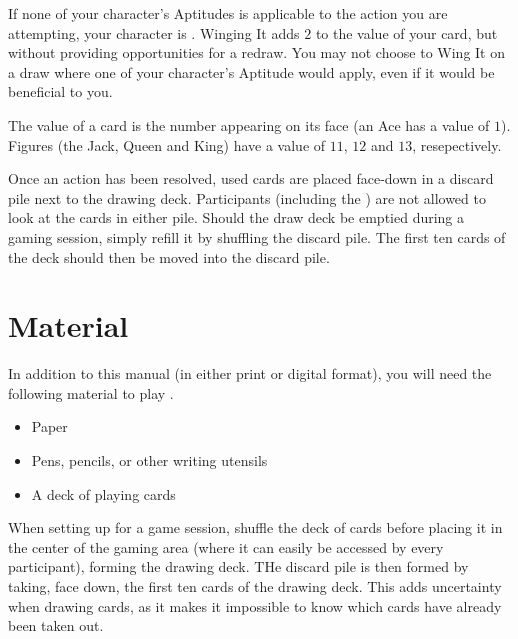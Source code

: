 If none of your character's Aptitudes is applicable to the action you are attempting, your character
is . Winging It adds $2$ to the value of your card, but without providing opportunities
for a redraw. You may not choose to Wing It on a draw where one of your character's Aptitude would apply, even
if it would be beneficial to you.

The value of a card is the number appearing on its face (an Ace has a value of $1$). Figures (the Jack, Queen
and King) have a value of $11$, $12$ and $13$, resepectively.

Once an action has been resolved, used cards are placed face-down in a discard pile next to the drawing deck.
Participants (including the \GM) are not allowed to look at the cards in either pile.
Should the draw deck be emptied during a gaming session, simply refill it by shuffling the discard pile.
The first ten cards of the deck should then be moved into the discard pile.

\section{Material}

In addition to this manual (in either print or digital format), you will need the following material to play
\ParadoxSpaceRPG.

\begin{itemize}
\item Paper
\item Pens, pencils, or other writing utensils
\item A deck of playing cards
\end{itemize}

When setting up for a game session, shuffle the deck of cards before placing it in the center of the gaming area
(where it can easily be accessed by every participant), forming the drawing deck. THe discard pile is then formed
by taking, face down, the first ten cards of the drawing deck. This adds uncertainty when drawing cards, as it
makes it impossible to know which cards have already been taken out.
